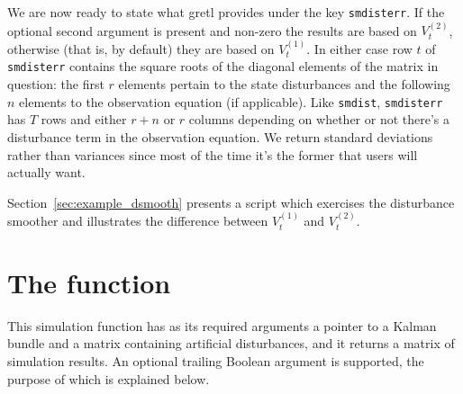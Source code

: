 We are now ready to state what gretl provides under the key
\texttt{smdisterr}. If the optional second argument is present and
non-zero the results are based on $V^{(2)}_t$, otherwise (that is, by
default) they are based on $V^{(1)}_t$. In either case row $t$ of
\texttt{smdisterr} contains the square roots of the diagonal elements
of the matrix in question: the first $r$ elements pertain to the state
disturbances and the following $n$ elements to the observation
equation (if applicable). Like \texttt{smdist}, \texttt{smdisterr} has
$T$ rows and either $r+n$ or $r$ columns depending on whether or not
there's a disturbance term in the observation equation. We return
standard deviations rather than variances since most of the time
it's the former that users will actually want.

Section~\ref{sec:example_dsmooth} presents a script which exercises
the disturbance smoother and illustrates the difference between
$V^{(1)}_t$ and $V^{(2)}_t$.


\section{The  function}
\label{sec:ksimul}

This simulation function has as its required arguments a pointer to a
Kalman bundle and a matrix containing artificial disturbances, and it
returns a matrix of simulation results. An optional trailing Boolean
argument is supported, the purpose of which is explained below.

